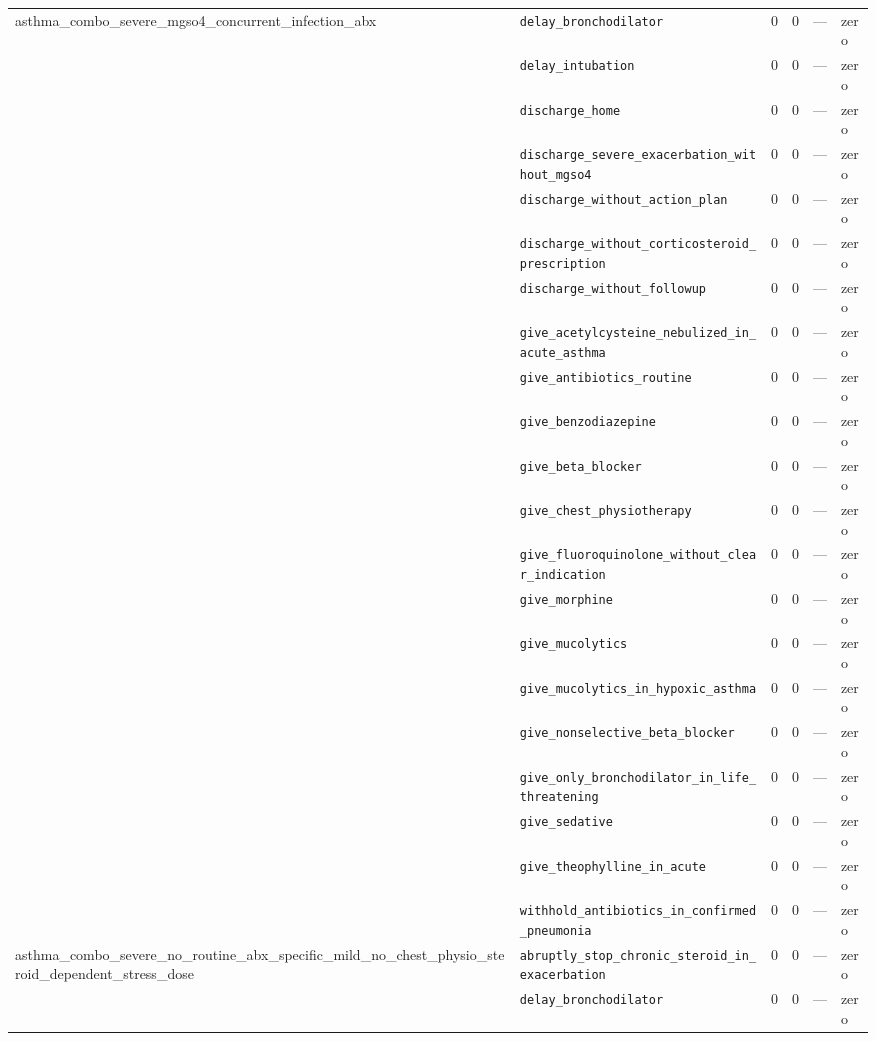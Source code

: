 \begin{table}[ht]
\begin{tabular}{llrrrl}
\midrule
asthma\_combo\_severe\_mgso4\_concurrent\_infection\_abx & \texttt{delay\_bronchodilator} & 0 & 0 & — & zero \\
 & \texttt{delay\_intubation} & 0 & 0 & — & zero \\
 & \texttt{discharge\_home} & 0 & 0 & — & zero \\
 & \texttt{discharge\_severe\_exacerbation\_without\_mgso4} & 0 & 0 & — & zero \\
 & \texttt{discharge\_without\_action\_plan} & 0 & 0 & — & zero \\
 & \texttt{discharge\_without\_corticosteroid\_prescription} & 0 & 0 & — & zero \\
 & \texttt{discharge\_without\_followup} & 0 & 0 & — & zero \\
 & \texttt{give\_acetylcysteine\_nebulized\_in\_acute\_asthma} & 0 & 0 & — & zero \\
 & \texttt{give\_antibiotics\_routine} & 0 & 0 & — & zero \\
 & \texttt{give\_benzodiazepine} & 0 & 0 & — & zero \\
 & \texttt{give\_beta\_blocker} & 0 & 0 & — & zero \\
 & \texttt{give\_chest\_physiotherapy} & 0 & 0 & — & zero \\
 & \texttt{give\_fluoroquinolone\_without\_clear\_indication} & 0 & 0 & — & zero \\
 & \texttt{give\_morphine} & 0 & 0 & — & zero \\
 & \texttt{give\_mucolytics} & 0 & 0 & — & zero \\
 & \texttt{give\_mucolytics\_in\_hypoxic\_asthma} & 0 & 0 & — & zero \\
 & \texttt{give\_nonselective\_beta\_blocker} & 0 & 0 & — & zero \\
 & \texttt{give\_only\_bronchodilator\_in\_life\_threatening} & 0 & 0 & — & zero \\
 & \texttt{give\_sedative} & 0 & 0 & — & zero \\
 & \texttt{give\_theophylline\_in\_acute} & 0 & 0 & — & zero \\
 & \texttt{withhold\_antibiotics\_in\_confirmed\_pneumonia} & 0 & 0 & — & zero \\
\midrule
asthma\_combo\_severe\_no\_routine\_abx\_specific\_mild\_no\_chest\_physio\_steroid\_dependent\_stress\_dose & \texttt{abruptly\_stop\_chronic\_steroid\_in\_exacerbation} & 0 & 0 & — & zero \\
 & \texttt{delay\_bronchodilator} & 0 & 0 & — & zero \\

\end{tabular}
\end{table}
